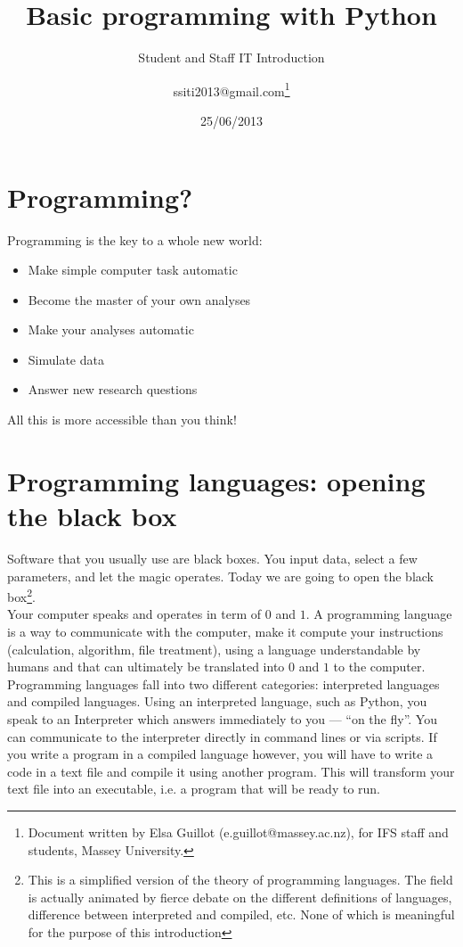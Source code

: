\documentclass[article,10pt]{scrartcl}
\begin{document}
\title{Basic programming with Python}
\subtitle{Student and Staff IT Introduction}
\date{25/06/2013}
\author{ssiti2013@gmail.com\footnote{Document written by Elsa Guillot (e.guillot@massey.ac.nz), for IFS staff and students, Massey University.}}
\maketitle
\section{Programming?}
Programming is the key to a whole new world: 
\begin{itemize}
\item Make simple computer task automatic
\item Become the master of your own analyses
\item Make your analyses automatic
\item Simulate data
\item Answer new research questions
\end{itemize}
All this is more accessible than you think!




\section{Programming languages: opening the black box}

Software that you usually use are black boxes. You input data, select a few parameters, and let the magic operates. Today we are going to open the black box\footnote{This is a simplified version of the theory of programming languages. The field is actually animated by fierce debate on the different definitions of languages, difference between interpreted and compiled, etc. None of which is meaningful for the purpose of this introduction}.
\\
Your computer speaks and operates in term of $0$ and $1$. A programming language is a way to communicate with the computer, make it compute your instructions (calculation, algorithm, file treatment), using a language understandable by humans and that can ultimately be translated into $0$ and $1$ to the computer.\\
 Programming languages fall into two different categories: interpreted languages and compiled languages. Using an interpreted language, such as Python, you speak to an Interpreter which answers immediately to you --- ``on the fly''. You can communicate to the interpreter directly in command lines or via scripts. If you write a program in a compiled language however, you will have to write a code in a text file and compile it using another program. This will transform your text file into an executable, i.e. a program that will be ready to run. 
\end{document}
